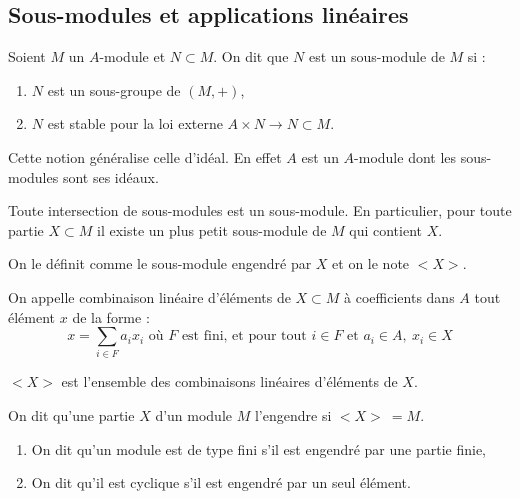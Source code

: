 \subsection{Sous-modules et applications linéaires}
\vspace{0.5em}

\begin{defi}
 
 Soient $M$ un $A$-module et $N \subset M$. On dit que $N$ est un sous-module
de $M$ si :
\begin{enumerate}
 \item $N$ est un sous-groupe de $(M,+)$,
 \item $N$ est stable pour la loi externe $A\times N \rightarrow N\subset M$.
\end{enumerate}
\end{defi}
\begin{example}[Remarque]
  Cette notion généralise celle d'idéal. En effet $A$ est un $A$-module dont les
sous-modules sont ses idéaux.
\end{example}

\begin{defiprop}
 
 Toute intersection de sous-modules est un sous-module. En particulier, pour
toute partie $X\subset M$ il existe un plus petit sous-module de $M$ qui
contient $X$.

On le définit comme le sous-module engendré par $X$ et on le note $<X>$.
\end{defiprop}

\begin{defi}
 
 On appelle combinaison linéaire d'éléments de $X\subset M$ à coefficients dans
$A$ tout élément $x$ de la forme :
\begin{displaymath}
 x = \sum_{i\in F} a_ix_i \text{ où } F \text{ est fini, et pour tout }
i\in F \text{ et } a_i\in A,\ x_i\in X
\end{displaymath}
\end{defi}

\begin{prop}
 
 $<X>$ est l'ensemble des combinaisons linéaires d'éléments de $X$.
\end{prop}

\begin{defi}
 
 On dit qu'une partie $X$ d'un module $M$ l'engendre si $<X>\ = M$.
 \begin{enumerate}
  \item On dit qu'un module est de type fini s'il est engendré par une partie
finie,
\item On dit qu'il est cyclique s'il est engendré par un seul élément.
 \end{enumerate}
\end{defi}

